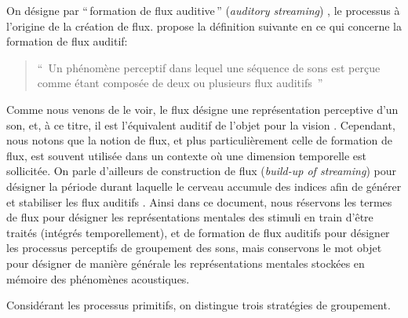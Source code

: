 On désigne par ``\,formation de flux auditive\,'' (\emph{auditory streaming}) , le processus à l'origine de la création de flux. \citep{winkler2009modeling} propose la définition suivante en ce qui concerne la formation de flux auditif:
\begin{quote}
``\, Un phénomène perceptif dans lequel une séquence de sons est perçue comme étant composée de deux ou plusieurs flux auditifs \,''
\end{quote}

Comme nous venons de le voir, le flux désigne une représentation perceptive d'un son, et, à ce titre, il est l'équivalent auditif de l'objet pour la vision \citep[p. 11]{bregman1994auditory}. Cependant, nous notons que la notion de flux, et plus particulièrement celle de formation de flux, est souvent utilisée dans un contexte où une dimension temporelle est sollicitée. On parle d'ailleurs de construction de flux  (\emph{build-up of streaming}) pour désigner la période durant laquelle le cerveau accumule des indices afin de générer et stabiliser les flux auditifs  \citep{cusack2004effects,snyder2007toward}. Ainsi dans ce document, nous réservons les termes de flux pour désigner les représentations mentales des stimuli en train d'être traités (intégrés temporellement), et de formation de flux auditifs pour désigner les processus perceptifs de groupement des sons, mais conservons le mot objet pour désigner de manière générale les représentations mentales stockées en mémoire des phénomènes acoustiques.

Considérant les processus primitifs, on distingue trois stratégies de groupement.

